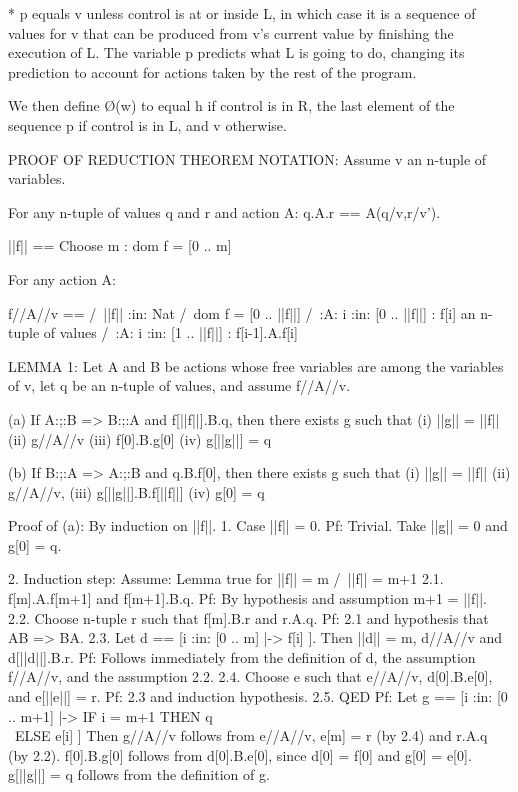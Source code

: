 \begin{spec}
* p equals v unless control is at or inside L, in which case it is
a sequence of values for v that can be produced from v's current
value by finishing the execution of L.  The variable p predicts what
L is going to do, changing its prediction to account for actions
taken by the rest of the program.  

We then define \O(w) to equal h if control is in R, the last
element of the sequence p if control is in L, and v otherwise.


PROOF OF REDUCTION THEOREM
NOTATION:  
Assume v an n-tuple of variables.

For any n-tuple of values q and r and action A:
  q.A.r == A(q/v,r/v').

||f|| == Choose m : dom f = [0 .. m]

For any action A:

  f//A//v == /\ ||f|| :in: Nat
             /\ dom f = [0 .. ||f||]
             /\ :A: i :in: [0 .. ||f||] : f[i] an n-tuple of values
             /\ :A: i :in: [1 .. ||f||] : f[i-1].A.f[i]

LEMMA 1: Let A and B be actions whose free variables are among the
variables of v, let q be an n-tuple of values, and assume f//A//v.

 (a) If A:;:B => B:;:A and f[||f||].B.q, then there exists g
     such that 
        (i) ||g|| = ||f||
       (ii) g//A//v
      (iii) f[0].B.g[0] 
       (iv) g[||g||] = q

 (b) If B:;:A => A:;:B and q.B.f[0], then there exists g
     such that 
        (i) ||g|| = ||f||
       (ii) g//A//v, 
      (iii) g[||g||].B.f[||f||]
       (iv) g[0] = q

Proof of (a): By induction on ||f||.  
1. Case ||f|| = 0.
   Pf: Trivial.  Take ||g|| = 0 and g[0] = q.

2. Induction step: 
   Assume: Lemma true for ||f|| = m /\ ||f|| = m+1
   2.1. f[m].A.f[m+1] and f[m+1].B.q.
        Pf: By hypothesis and assumption m+1 = ||f||.
   2.2. Choose n-tuple r such that f[m].B.r and r.A.q.
        Pf: 2.1 and hypothesis that AB => BA.
   2.3. Let d == [i :in: [0 .. m] |-> f[i] ].  Then
        ||d|| = m, d//A//v and d[||d||].B.r.
        Pf: Follows immediately from the definition of d, the 
        assumption f//A//v, and the assumption 2.2.
   2.4. Choose e such that e//A//v, d[0].B.e[0], and e[||e||] = r.
        Pf: 2.3 and induction hypothesis.
   2.5. QED
        Pf: Let g == [i :in: [0 .. m+1] |-> IF i = m+1 THEN q
\\\                                                    ELSE e[i] ]
        Then g//A//v follows from e//A//v, e[m] = r (by 2.4)
        and r.A.q (by 2.2).
        f[0].B.g[0] follows from d[0].B.e[0], since d[0] = f[0]
        and g[0] = e[0].
        g[||g||] = q follows from the definition of g.


\end{spec}
